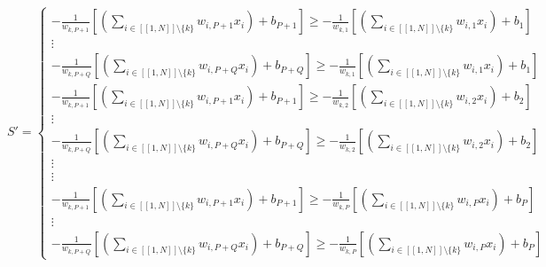 \documentclass{article}
\begin{document}
\begin{appendices}
        \begin{equation*}
             S'=
            \begin{cases}
                - \frac{1}{w_{k,P+1}}[(\sum_{i \in [\![1,N]\!] \setminus \lbrace{k}\rbrace}  w_{i,P+1}x_{i}) + b_{P+1}] 
                \geqslant - \frac{1}{w_{k,1}}[(\sum_{i \in [\![1,N]\!] \setminus \lbrace{k}\rbrace}  w_{i,1}x_{i}) + b_{1}]
                \\ \vdots 
                \\ - \frac{1}{w_{k,P+Q}}[(\sum_{i \in [\![1,N]\!] \setminus \lbrace{k}\rbrace}  w_{i,P+Q}x_{i}) + b_{P+Q}] 
                \geqslant - \frac{1}{w_{k,1}}[(\sum_{i \in [\![1,N]\!] \setminus \lbrace{k}\rbrace}  w_{i,1}x_{i}) + b_{1}]
                \\- \frac{1}{w_{k,P+1}}[(\sum_{i \in [\![1,N]\!] \setminus \lbrace{k}\rbrace}  w_{i,P+1}x_{i}) + b_{P+1}] 
                \geqslant - \frac{1}{w_{k,2}}[(\sum_{i \in [\![1,N]\!] \setminus \lbrace{k}\rbrace}  w_{i,2}x_{i}) + b_{2}]
                \\ \vdots 
                \\ - \frac{1}{w_{k,P+Q}}[(\sum_{i \in [\![1,N]\!] \setminus \lbrace{k}\rbrace}  w_{i,P+Q}x_{i}) + b_{P+Q}] 
                \geqslant - \frac{1}{w_{k,2}}[(\sum_{i \in [\![1,N]\!] \setminus \lbrace{k}\rbrace}  w_{i,2}x_{i}) + b_{2}]
                \\ \vdots 
                \\ \vdots 
                \\- \frac{1}{w_{k,P+1}}[(\sum_{i \in [\![1,N]\!] \setminus \lbrace{k}\rbrace}  w_{i,P+1}x_{i}) + b_{P+1}] 
                \geqslant - \frac{1}{w_{k,P}}[(\sum_{i \in [\![1,N]\!] \setminus \lbrace{k}\rbrace}  w_{i,P}x_{i}) + b_{P}]
                \\ \vdots 
                \\ - \frac{1}{w_{k,P+Q}}[(\sum_{i \in [\![1,N]\!] \setminus \lbrace{k}\rbrace}  w_{i,P+Q}x_{i}) + b_{P+Q}] 
                \geqslant - \frac{1}{w_{k,P}}[(\sum_{i \in [\![1,N]\!] \setminus \lbrace{k}\rbrace}  w_{i,P}x_{i}) + b_{P}]

                
            \end{cases}
            \end{equation*}


\end{appendices}
\end{document}
